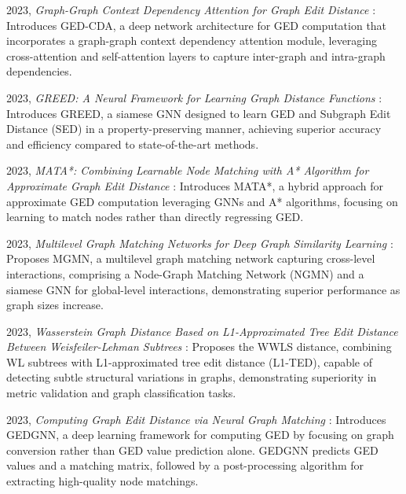 \documentclass[../Thesis.tex]{subfiles}
\begin{document}
	2023, \textit{Graph-Graph Context Dependency Attention for Graph Edit Distance} \cite{graph_graph_context_dependency_attention_for_graph_edit_distance}: Introduces GED-CDA, a deep network architecture for GED computation that incorporates a graph-graph context dependency attention module, leveraging cross-attention and self-attention layers to capture inter-graph and intra-graph dependencies.
	
	2023, \textit{GREED: A Neural Framework for Learning Graph Distance Functions} \cite{greed__a_neural_framework_for_learning_graph_distance_functions}: Introduces GREED, a siamese GNN designed to learn GED and Subgraph Edit Distance (SED) in a property-preserving manner, achieving superior accuracy and efficiency compared to state-of-the-art methods.
	
	2023, \textit{MATA*: Combining Learnable Node Matching with A* Algorithm for Approximate Graph Edit Distance} \cite{mata_combining_learnable_node_matching_with_a*_algorithm_for_approximate_graph_edit_distance}: Introduces MATA*, a hybrid approach for approximate GED computation leveraging GNNs and A* algorithms, focusing on learning to match nodes rather than directly regressing GED.
	
	2023, \textit{Multilevel Graph Matching Networks for Deep Graph Similarity Learning} \cite{multilevel_graph_matching_networks_for_deep_graph_similarity_learning}: Proposes MGMN, a multilevel graph matching network capturing cross-level interactions, comprising a Node-Graph Matching Network (NGMN) and a siamese GNN for global-level interactions, demonstrating superior performance as graph sizes increase.
	
	2023, \textit{Wasserstein Graph Distance Based on L1-Approximated Tree Edit Distance Between Weisfeiler-Lehman Subtrees} \cite{wasserstein_graph_distance_based_on_l1_approximated_tree_edit_distance_between_weisfeiler_lehman_subtrees}: Proposes the WWLS distance, combining WL subtrees with L1-approximated tree edit distance (L1-TED), capable of detecting subtle structural variations in graphs, demonstrating superiority in metric validation and graph classification tasks.
	
	
	2023, \textit{Computing Graph Edit Distance via Neural Graph Matching} \cite{computing_graph_edit_distance_via_neural_graph_matching}: Introduces GEDGNN, a deep learning framework for computing GED by focusing on graph conversion rather than GED value prediction alone. GEDGNN predicts GED values and a matching matrix, followed by a post-processing algorithm for extracting high-quality node matchings.
	
\end{document}
